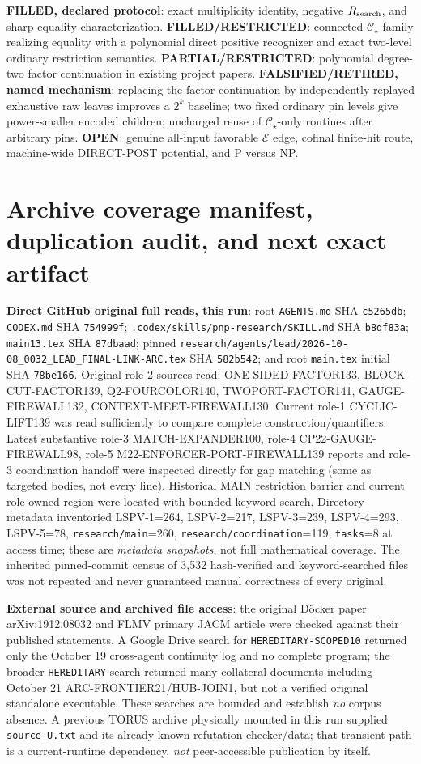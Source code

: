 \documentclass[11pt]{article}
\newcommand{\CS}{\mathcal C_\star}
\begin{document}
\textbf{FILLED, declared protocol}: exact multiplicity identity, negative \(R_{\rm search}\), and sharp equality characterization. \textbf{FILLED/RESTRICTED}: connected \(\CS\) family realizing equality with a polynomial direct positive recognizer and exact two-level ordinary restriction semantics. \textbf{PARTIAL/RESTRICTED}: polynomial degree-two factor continuation in existing project papers. \textbf{FALSIFIED/RETIRED, named mechanism}: replacing the factor continuation by independently replayed exhaustive raw leaves improves a \(2^k\) baseline; two fixed ordinary pin levels give power-smaller encoded children; uncharged reuse of \(\CS\)-only routines after arbitrary pins. \textbf{OPEN}: genuine all-input favorable \(\mathcal E\) edge, cofinal finite-hit route, machine-wide DIRECT-POST potential, and P versus NP.

\section{Archive coverage manifest, duplication audit, and next exact artifact}
\textbf{Direct GitHub original full reads, this run}: root \texttt{AGENTS.md} SHA \texttt{c5265db}; \texttt{CODEX.md} SHA \texttt{754999f}; \texttt{.codex/skills/pnp-research/SKILL.md} SHA \texttt{b8df83a}; \texttt{main13.tex} SHA \texttt{87dbaad}; pinned \texttt{research/agents/lead/2026-10-08\_0032\_LEAD\_FINAL-LINK-ARC.tex} SHA \texttt{582b542}; and root \texttt{main.tex} initial SHA \texttt{78be166}. Original role-2 sources read: ONE-SIDED-FACTOR133, BLOCK-CUT-FACTOR139, Q2-FOURCOLOR140, TWOPORT-FACTOR141, GAUGE-FIREWALL132, CONTEXT-MEET-FIREWALL130. Current role-1 CYCLIC-LIFT139 was read sufficiently to compare complete construction/quantifiers. Latest substantive role-3 MATCH-EXPANDER100, role-4 CP22-GAUGE-FIREWALL98, role-5 M22-ENFORCER-PORT-FIREWALL139 reports and role-3 coordination handoff were inspected directly for gap matching (some as targeted bodies, not every line). Historical MAIN restriction barrier and current role-owned region were located with bounded keyword search. Directory metadata inventoried LSPV-1=264, LSPV-2=217, LSPV-3=239, LSPV-4=293, LSPV-5=78, \texttt{research/main}=260, \texttt{research/coordination}=119, \texttt{tasks}=8 at access time; these are \emph{metadata snapshots}, not full mathematical coverage. The inherited pinned-commit census of 3,532 hash-verified and keyword-searched files was not repeated and never guaranteed manual correctness of every original.

\textbf{External source and archived file access}: the original D\"ocker paper arXiv:1912.08032 and FLMV primary JACM article were checked against their published statements. A Google Drive search for \texttt{HEREDITARY-SCOPED10} returned only the October 19 cross-agent continuity log and no complete program; the broader \texttt{HEREDITARY} search returned many collateral documents including October 21 ARC-FRONTIER21/HUB-JOIN1, but not a verified original standalone executable. These searches are bounded and establish \emph{no} corpus absence. A previous TORUS archive physically mounted in this run supplied \texttt{source\_U.txt} and its already known refutation checker/data; that transient path is a current-runtime dependency, \emph{not} peer-accessible publication by itself.
\end{document}
